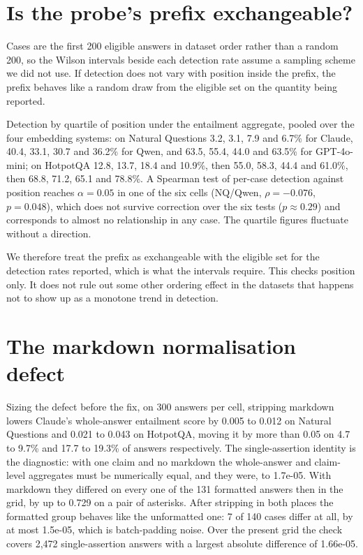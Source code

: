\documentclass[11pt]{article}
\begin{document}
\section{Is the probe's prefix exchangeable?}
\label{app:prefix}

Cases are the first 200 eligible answers in dataset order rather than a random 200, so the Wilson intervals beside each detection rate assume a sampling scheme we did not use. If detection does not vary with position inside the prefix, the prefix behaves like a random draw from the eligible set on the quantity being reported.

Detection by quartile of position under the entailment aggregate, pooled over the four embedding systems: on Natural Questions 3.2, 3.1, 7.9 and 6.7\% for Claude, 40.4, 33.1, 30.7 and 36.2\% for Qwen, and 63.5, 55.4, 44.0 and 63.5\% for GPT-4o-mini; on HotpotQA 12.8, 13.7, 18.4 and 10.9\%, then 55.0, 58.3, 44.4 and 61.0\%, then 68.8, 71.2, 65.1 and 78.8\%. A Spearman test of per-case detection against position reaches $\alpha = 0.05$ in one of the six cells (NQ/Qwen, $\rho = -0.076$, $p = 0.048$), which does not survive correction over the six tests ($p \approx 0.29$) and corresponds to almost no relationship in any case. The quartile figures fluctuate without a direction.

We therefore treat the prefix as exchangeable with the eligible set for the detection rates reported, which is what the intervals require. This checks position only. It does not rule out some other ordering effect in the datasets that happens not to show up as a monotone trend in detection.


\section{The markdown normalisation defect}
\label{app:markdown}

Sizing the defect before the fix, on 300 answers per cell, stripping markdown lowers Claude's whole-answer entailment score by 0.005 to 0.012 on Natural Questions and 0.021 to 0.043 on HotpotQA, moving it by more than 0.05 on 4.7 to 9.7\% and 17.7 to 19.3\% of answers respectively. The single-assertion identity is the diagnostic: with one claim and no markdown the whole-answer and claim-level aggregates must be numerically equal, and they were, to 1.7e-05. With markdown they differed on every one of the 131 formatted answers then in the grid, by up to 0.729 on a pair of asterisks. After stripping in both places the formatted group behaves like the unformatted one: 7 of 140 cases differ at all, by at most 1.5e-05, which is batch-padding noise. Over the present grid the check covers 2,472 single-assertion answers with a largest absolute difference of 1.66e-05.
\end{document}
